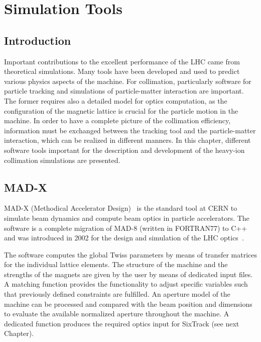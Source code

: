 \chapter{Simulation Tools}\label{chap:simulation_tools}
\section*{Introduction}
Important contributions to the excellent performance of the LHC came from theoretical simulations. Many tools have been developed and used to predict various physics aspects of the machine. For collimation, particularly software for particle tracking and simulations of particle-matter interaction are important. The former requires also a detailed model for optics computation, as the configuration of the magnetic lattice is crucial for the particle motion in the machine. In order to have a complete picture of the collimation efficiency, information must be exchanged between the tracking tool and the particle-matter interaction, which can be realized in different manners. In this chapter, different software tools important for the description and development of the heavy-ion collimation simulations are presented.




\section{MAD-X}
MAD-X (Methodical Accelerator Design)~\cite{MADXref01} is the standard tool at CERN to simulate beam dynamics and compute beam optics in particle accelerators. The software is a complete migration of MAD-8 (written in FORTRAN77) to C++ and was introduced in 2002 for the design and simulation of the LHC optics~\cite{MADXref02}.

The software computes the global Twiss parameters by means of transfer matrices for the individual lattice elements. The structure of the machine and the strengths of the magnets are given by the user by means of dedicated input files. A matching function provides the functionality to adjust specific variables such that previously defined constraints are fulfilled. An aperture model of the machine can be processed and compared with the beam position and dimensions to evaluate the available normalized aperture throughout the machine. A dedicated function produces the required optics input for SixTrack (see next Chapter). 




